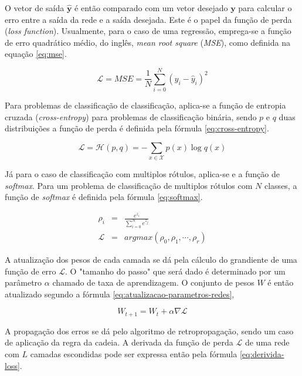 O vetor de saída $\boldsymbol{\hat{y}}$ é então comparado com um vetor desejado 
$\boldsymbol{y}$ para calcular o erro entre a saída da rede e a saída desejada.
Este é o papel da função de perda (\textit{loss function}). 
Usualmente, para o caso de uma regressão, emprega-se a função de erro quadrático médio, 
do inglês, \textit{mean root square} (\textit{MSE}), como definida na equação
\ref{eq:mse}.

\begin{equation}\label{eq:mse}
    \mathcal{L} = MSE = \frac{1}{N} \sum_{i=0}^{N}(y_i - \hat{y}_i)^{2}
\end{equation}

Para problemas de classificação de classificação, aplica-se a função de entropia
cruzada (\textit{cross-entropy}) para problemas de classificação binária, sendo
$p$ e $q$ duas distribuições a função de perda é definida pela fórmula 
\ref{eq:cross-entropy}.

\begin{equation}\label{eq:cross-entropy}
    \mathcal{L} = \mathcal{H}(p,q) = - \sum_{x \in \mathcal{X}}{}p(x) \log q(x)
\end{equation}

Já para o caso de classificação com multiplos rótulos, aplica-se e a função 
de \textit{softmax}. Para um problema de classificação de multiplos rótulos com 
$N$ classes, a função de \textit{softmax} é definida pela fórmula \ref{eq:softmax}.

\begin{eqnarray}
    \rho_i &=& \frac{e^{z_i}}{\sum_{i=0}^{N}e^{z_j}} \\
    \mathcal{L} &=& arg max (\rho_0, \rho_1, \cdots, \rho_r) \label{eq:softmax}
\end{eqnarray}

A atualização dos pesos de cada camada se dá pela cálculo do grandiente
de uma função de erro $\mathcal{L}$. O "tamanho do passo" que será dado
é determinado por um parâmetro $\alpha$ chamado de taxa de aprendizagem.
O conjunto de pesos $W$ é então atualizado segundo a fórmula 
\ref{eq:atualizacao-parametros-redes},

\begin{equation}\label{eq:atualizacao-parametros-redes}
    W_{t + 1} = W_{t} + \alpha \nabla \mathcal{L}
\end{equation}

A propagação dos erros se dá pelo algoritmo de retropropagação, sendo um caso 
de aplicação da regra da cadeia. A derivada da função de perda $\mathcal{L}$ de 
uma rede com $L$ camadas escondidas pode ser expressa então pela fórmula 
\ref{eq:derivida-loss}.

